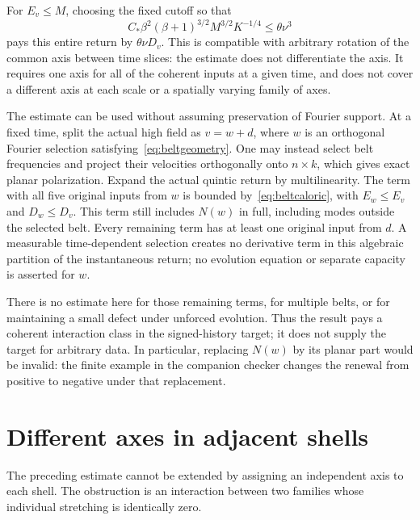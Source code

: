 \documentclass[11pt]{article}
\begin{document}
For $E_v\leq M$, choosing the fixed cutoff so that
\begin{equation}\label{eq:beltabsorption}
 C_*\beta^2(\beta+1)^{3/2}M^{3/2}K^{-1/4}\leq\theta\nu^3
\end{equation}
pays this entire return by $\theta\nu D_v$. This is compatible with
arbitrary rotation of the common axis between time slices: the estimate
does not differentiate the axis. It requires one axis for all of the
coherent inputs at a given time, and does not cover a different axis at
each scale or a spatially varying family of axes.

The estimate can be used without assuming preservation of Fourier support.
At a fixed time, split the actual high field as $v=w+d$, where $w$ is
an orthogonal Fourier selection satisfying~\eqref{eq:beltgeometry}.
One may instead select belt frequencies and project their velocities
orthogonally onto $n\times k$, which gives exact planar polarization.
Expand the actual quintic return by multilinearity. The term with all
five original inputs from $w$ is bounded by~\eqref{eq:beltcaloric}, with
$E_w\leq E_v$ and $D_w\leq D_v$. This term still includes $N(w)$ in full,
including modes outside the selected belt. Every remaining term has at
least one original input from $d$. A measurable time-dependent selection creates
no derivative term in this algebraic partition of the instantaneous
return; no evolution equation or separate capacity is asserted for $w$.

There is no estimate here for those remaining terms, for multiple belts,
or for maintaining a small defect under unforced evolution. Thus the
result pays a coherent interaction class in the signed-history target;
it does not supply the target for arbitrary data. In particular,
replacing $N(w)$ by its planar part would be invalid: the finite example
in the companion checker changes the renewal from positive to negative
under that replacement.

\section{Different axes in adjacent shells}

The preceding estimate cannot be extended by assigning an independent
axis to each shell. The obstruction is an interaction between two
families whose individual stretching is identically zero.
\end{document}
